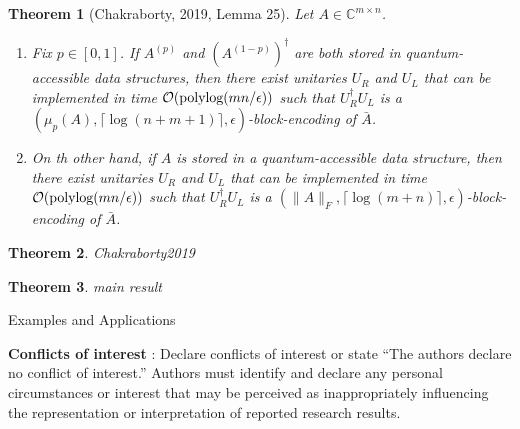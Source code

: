 \documentclass[10pt,twoside,reqno]{amsart} %
\makeatletter
\renewcommand{\section}{\@startsection{section}{1}
   \z@{.7\linespacing\@plus\linespacing}{.5\linespacing}
   {\normalfont\upshape\bfseries\centering}}
\theoremstyle{plain}
\newtheorem{thm}{Theorem}[section]
\theoremstyle{definition}
\makeatother
\begin{document}
\begin{thm}[Chakraborty, 2019, Lemma 25]
  Let $A\in\mathbb{C}^{m\times n}$.
  \begin{enumerate}
    \item Fix $p\in [0,1]$. If $A^{(p)}$ and $(A^{(1-p)})^{\dagger}$ are both
      stored in quantum-accessible data structures, then there exist
      unitaries $U_R$ and $U_L$ that can be implemented in time
      $\mathcal{O}(\textrm{\normalfont polylog}(mn/\epsilon))$ such that
      $U_R^{\dagger}U_L$ is a $(\mu_p(A), \lceil\log(n+m+1)\rceil, 
      \epsilon)$-block-encoding of $\bar{A}$.
    \item On th other hand, if $A$ is stored in a quantum-accessible data
      structure, then there exist unitaries $U_R$ and $U_L$ that can
      be implemented in time $\mathcal{O}(\textrm{\normalfont polylog}(mn/\epsilon))$ such
      that $U_R^{\dagger}U_L$ is a $(\|A\|_F, \lceil\log(m+n)\rceil,
      \epsilon)$-block-encoding of $\bar{A}$.
  \end{enumerate}
\end{thm}

\begin{thm}
  Chakraborty2019 
\end{thm}

\begin{thm}
  main result 
\end{thm}

\section{Examples and Applications}







\bigskip
{\bf Conflicts of interest} : {Declare conflicts of interest or state ``The authors declare no conflict of interest.'' Authors must identify and declare any personal circumstances or interest that may be perceived as inappropriately influencing the representation or interpretation of reported research results.} 
\end{document}
